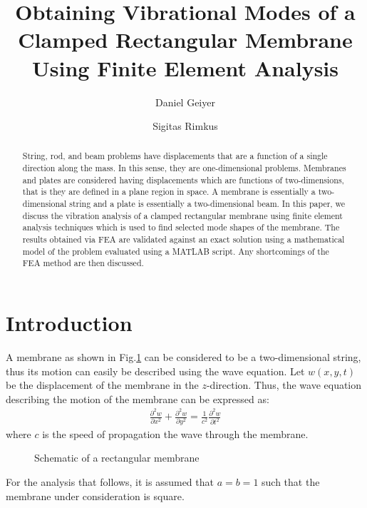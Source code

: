 \documentclass[12pt]{article}
\begin{document}
\title{Obtaining Vibrational Modes of a Clamped Rectangular Membrane Using Finite Element Analysis}
\author{Daniel Geiyer \and Sigitas Rimkus}
\date{}
\maketitle

\thispagestyle{empty}

\begin{abstract}
String, rod, and beam problems have displacements that are a function of a single direction along the mass.  In this sense, they are one-dimensional problems.  Membranes and plates are considered having displacements which are functions of two-dimensions, that is they are defined in a plane region in space.  A membrane is essentially a two-dimensional string and a plate is essentially a two-dimensional beam.  In this paper, we discuss the vibration analysis of a clamped rectangular membrane using finite element analysis techniques which is used to find selected mode shapes of the membrane.  The results obtained via FEA are validated against an exact solution using a mathematical model of the problem evaluated using a MATLAB script.  Any shortcomings of the FEA method are then discussed.
\end{abstract}

\newpage

\tableofcontents

\newpage

\section{Introduction}
A membrane as shown in Fig.\ref{membrane} can be considered to be a two-dimensional string, thus its motion can easily be described using the wave equation.  Let $w(x,y,t)$ be the displacement of the membrane in the $z$-direction.  Thus, the wave equation describing the motion of the membrane can be expressed as:
\begin{align}
	\label{wave_equation}
	\frac{\partial^2w}{\partial x^2}+\frac{\partial^2w}{\partial y^2}=\frac{1}{c^2}\frac{\partial^2w}{\partial t^2}
\end{align}
where $c$ is the speed of propagation the wave through the membrane.
\begin{figure}[h]
	\centering
	\label{membrane}
	\resizebox{0.5\textwidth}{!}{}
	\caption{Schematic of a rectangular membrane}
\end{figure}
For the analysis that follows, it is assumed that $a=b=1$ such that the membrane under consideration is square.
\end{document}
